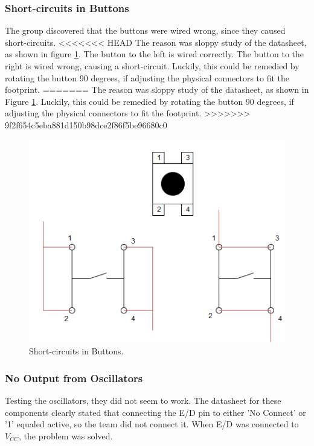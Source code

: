 \subsubsection{Short-circuits in Buttons}
The group discovered that the buttons were wired wrong, since they caused short-circuits.
<<<<<<< HEAD
The reason was sloppy study of the datasheet, as shown in figure \ref{fig:Button Issue}. The button to the left is wired correctly. The button to the right is wired wrong, causing a short-circuit.
Luckily, this could be remedied by rotating the button 90 degrees, if adjusting the physical connectors to fit the footprint. 
=======
The reason was sloppy study of the datasheet, as shown in Figure \ref{fig:Button Issue}.
Luckily, this could be remedied by rotating the button 90 degrees, if adjusting the physical connectors to fit the footprint.
>>>>>>> 9f2f654c5eba881d150b98dce2f86f5be96680c0

\begin{figure}[h!]
\centering
\includegraphics[scale=0.5]{images/Button_Issue.png}
\caption{Short-circuits in Buttons.}
\label{fig:Button Issue}
\end{figure}

\subsubsection{No Output from Oscillators}
Testing the oscillators, they did not seem to work.
The datasheet for these components clearly stated that connecting the E/D pin to either 'No Connect' or '1' equaled active, so the team did not connect it.
When E/D was connected to \(V_{CC}\), the problem was solved.

